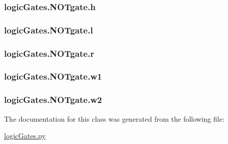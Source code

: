 \subsubsection[{h}]{\setlength{\rightskip}{0pt plus 5cm}logic\+Gates.\+N\+O\+Tgate.\+h}\label{classlogic_gates_1_1_n_o_tgate_afc9d219c6fc7e218b0ef26bd21adbd8f}
\hypertarget{classlogic_gates_1_1_n_o_tgate_ab47a320e872d79c3f1e37f57d05ce7c1}{}
\subsubsection[{l}]{\setlength{\rightskip}{0pt plus 5cm}logic\+Gates.\+N\+O\+Tgate.\+l}\label{classlogic_gates_1_1_n_o_tgate_ab47a320e872d79c3f1e37f57d05ce7c1}
\hypertarget{classlogic_gates_1_1_n_o_tgate_adb710f70194af197f3f8a1d34c90a8a4}{}
\subsubsection[{r}]{\setlength{\rightskip}{0pt plus 5cm}logic\+Gates.\+N\+O\+Tgate.\+r}\label{classlogic_gates_1_1_n_o_tgate_adb710f70194af197f3f8a1d34c90a8a4}
\hypertarget{classlogic_gates_1_1_n_o_tgate_aa5e10a5bdbf9f08eda14cd29a24c441d}{}
\subsubsection[{w1}]{\setlength{\rightskip}{0pt plus 5cm}logic\+Gates.\+N\+O\+Tgate.\+w1}\label{classlogic_gates_1_1_n_o_tgate_aa5e10a5bdbf9f08eda14cd29a24c441d}
\hypertarget{classlogic_gates_1_1_n_o_tgate_ae6ee30c79e4d96547825e82bd0aec53f}{}
\subsubsection[{w2}]{\setlength{\rightskip}{0pt plus 5cm}logic\+Gates.\+N\+O\+Tgate.\+w2}\label{classlogic_gates_1_1_n_o_tgate_ae6ee30c79e4d96547825e82bd0aec53f}


The documentation for this class was generated from the following file\+:\begin{DoxyCompactItemize}
\item 
\hyperlink{logic_gates_8py}{logic\+Gates.\+py}\end{DoxyCompactItemize}
